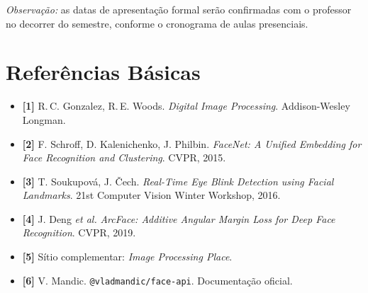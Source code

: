 \documentclass[12pt,a4paper]{article}
\begin{document}
\textit{Observa\c{c}\~ao:} as datas de apresenta\c{c}\~ao formal ser\~ao confirmadas com o professor
no decorrer do semestre, conforme o cronograma de aulas presenciais.

\section*{Refer\^encias B\'asicas}

\begin{itemize}[leftmargin=*]
    \item \textbf{[1]} R.\,C. Gonzalez, R.\,E. Woods. \emph{Digital Image Processing}.
    Addison-Wesley Longman.

    \item \textbf{[2]} F. Schroff, D. Kalenichenko, J. Philbin. \emph{FaceNet: A Unified
    Embedding for Face Recognition and Clustering}. CVPR, 2015.

    \item \textbf{[3]} T. Soukupov\'a, J. \v{C}ech. \emph{Real-Time Eye Blink Detection using
    Facial Landmarks}. 21st Computer Vision Winter Workshop, 2016.

    \item \textbf{[4]} J. Deng \emph{et al.} \emph{ArcFace: Additive Angular Margin Loss for
    Deep Face Recognition}. CVPR, 2019.

    \item \textbf{[5]} S\'itio complementar: \emph{Image Processing Place}.

    \item \textbf{[6]} V. Mandic. \texttt{@vladmandic/face-api}. Documenta\c{c}\~ao oficial.
\end{itemize}
\end{document}
